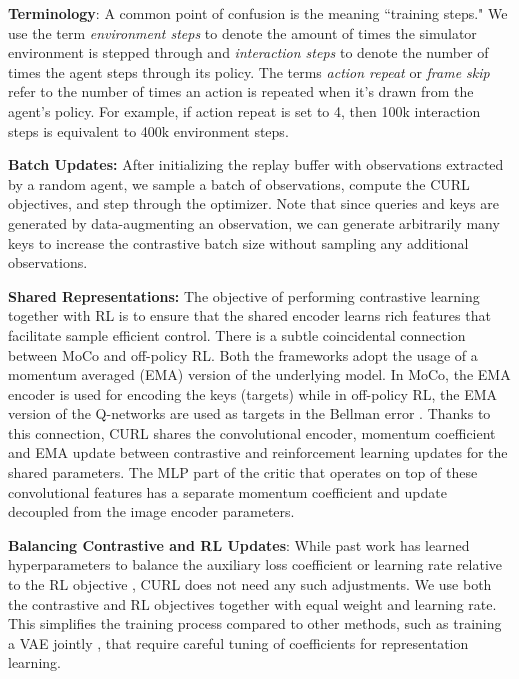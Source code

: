 {\textbf{Terminology}:} A common point of confusion is the meaning  ``training steps." We use the term \textit{environment steps} to denote the amount of times the simulator environment is stepped through and \textit{interaction steps} to denote the number of times the agent steps through its policy. The terms \textit{action repeat} or \textit{frame skip} refer to the number of times an action is repeated when it's drawn from the agent's policy. For example, if action repeat is set to 4, then 100k interaction steps is equivalent to 400k environment steps.


{\textbf{Batch Updates:}} After initializing the replay buffer with observations extracted by a random agent, we sample a batch of observations, compute the CURL objectives, and step through the optimizer. Note that since queries and keys are generated by data-augmenting an observation, we can generate arbitrarily many keys to increase the contrastive batch size without sampling any additional observations.

{\textbf{Shared Representations:}}  
The objective of performing contrastive learning together with RL is to ensure that the shared encoder learns rich features that facilitate sample efficient control. There is a subtle coincidental connection between MoCo and off-policy RL. Both the frameworks adopt the usage of a momentum averaged (EMA) version of the underlying model. In MoCo, the EMA encoder is used for encoding the keys (targets) while in off-policy RL, the EMA version of the Q-networks are used as targets in the Bellman error \cite{mnih2015human, haarnoja2018soft}. Thanks to this connection, CURL shares the convolutional encoder, momentum coefficient and EMA update between contrastive and reinforcement learning updates for the shared parameters. The MLP part of the critic that operates on top of these convolutional features has a separate momentum coefficient and update decoupled from the image encoder parameters.

{\textbf{Balancing Contrastive and RL Updates}:}
While past work has learned hyperparameters to balance the auxiliary loss coefficient or learning rate relative to the RL objective \cite{jaderberg2016reinforcement, yarats2019improving}, CURL does not need any such adjustments. We use both the contrastive and RL objectives together with equal weight and learning rate. This simplifies the training process compared to other methods, such as training a VAE jointly \cite{hafner2018learning,hafner2019dream,lee2019stochastic}, that require careful tuning of coefficients for representation learning.


